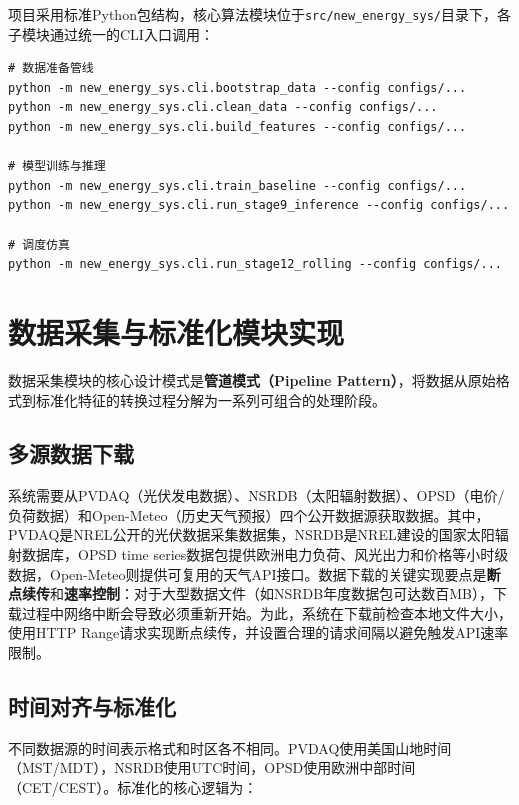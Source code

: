 \documentclass[12pt,a4paper]{ctexbook}
\begin{document}
项目采用标准Python包结构，核心算法模块位于\texttt{src/new\_energy\_sys/}目录下，各子模块通过统一的CLI入口调用：

\begin{lstlisting}[caption={CLI入口示例}, label={lst:cli}]
# 数据准备管线
python -m new_energy_sys.cli.bootstrap_data --config configs/...
python -m new_energy_sys.cli.clean_data --config configs/...
python -m new_energy_sys.cli.build_features --config configs/...

# 模型训练与推理
python -m new_energy_sys.cli.train_baseline --config configs/...
python -m new_energy_sys.cli.run_stage9_inference --config configs/...

# 调度仿真
python -m new_energy_sys.cli.run_stage12_rolling --config configs/...
\end{lstlisting}

\section{数据采集与标准化模块实现}

数据采集模块的核心设计模式是\textbf{管道模式（Pipeline Pattern）}，将数据从原始格式到标准化特征的转换过程分解为一系列可组合的处理阶段。\cite{design-patterns}

\subsection{多源数据下载}

系统需要从PVDAQ（光伏发电数据）、NSRDB（太阳辐射数据）、OPSD（电价/负荷数据）和Open-Meteo（历史天气预报）四个公开数据源获取数据。其中，PVDAQ是NREL公开的光伏数据采集数据集，NSRDB是NREL建设的国家太阳辐射数据库，OPSD time series数据包提供欧洲电力负荷、风光出力和价格等小时级数据，Open-Meteo则提供可复用的天气API接口\cite{pvdaq-nrel,nsrdb-nrel,opsd-datapackage-2020,opsd-wiese-2019,open-meteo-2023}。数据下载的关键实现要点是\textbf{断点续传}和\textbf{速率控制}：对于大型数据文件（如NSRDB年度数据包可达数百MB），下载过程中网络中断会导致必须重新开始。为此，系统在下载前检查本地文件大小，使用HTTP Range请求实现断点续传，并设置合理的请求间隔以避免触发API速率限制。\cite{pvdaq-nrel,nsrdb-nrel,opsd-datapackage-2020,opsd-wiese-2019,open-meteo-2023}

\subsection{时间对齐与标准化}

不同数据源的时间表示格式和时区各不相同。PVDAQ使用美国山地时间（MST/MDT），NSRDB使用UTC时间，OPSD使用欧洲中部时间（CET/CEST）。标准化的核心逻辑为：\cite{pvdaq-nrel,nsrdb-nrel,opsd-wiese-2019}
\end{document}
